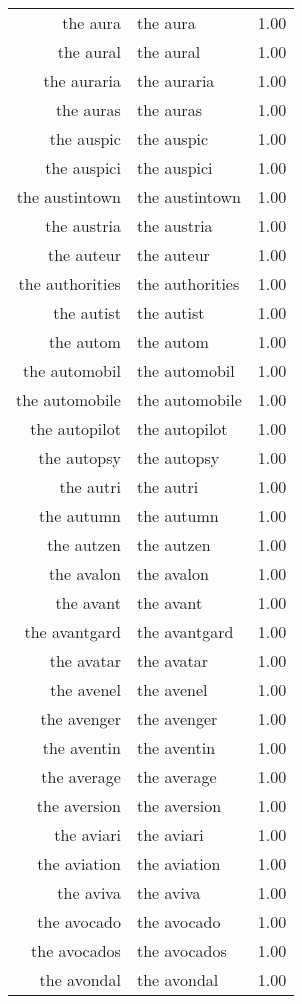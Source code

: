 \begin{table}[ht]
\begin{tabular}{rlr}
  the aura & the aura & 1.00 \\ 
  the aural & the aural & 1.00 \\ 
  the auraria & the auraria & 1.00 \\ 
  the auras & the auras & 1.00 \\ 
  the auspic & the auspic & 1.00 \\ 
  the auspici & the auspici & 1.00 \\ 
  the austintown & the austintown & 1.00 \\ 
  the austria & the austria & 1.00 \\ 
  the auteur & the auteur & 1.00 \\ 
  the authorities & the authorities & 1.00 \\ 
  the autist & the autist & 1.00 \\ 
  the autom & the autom & 1.00 \\ 
  the automobil & the automobil & 1.00 \\ 
  the automobile & the automobile & 1.00 \\ 
  the autopilot & the autopilot & 1.00 \\ 
  the autopsy & the autopsy & 1.00 \\ 
  the autri & the autri & 1.00 \\ 
  the autumn & the autumn & 1.00 \\ 
  the autzen & the autzen & 1.00 \\ 
  the avalon & the avalon & 1.00 \\ 
  the avant & the avant & 1.00 \\ 
  the avantgard & the avantgard & 1.00 \\ 
  the avatar & the avatar & 1.00 \\ 
  the avenel & the avenel & 1.00 \\ 
  the avenger & the avenger & 1.00 \\ 
  the aventin & the aventin & 1.00 \\ 
  the average & the average & 1.00 \\ 
  the aversion & the aversion & 1.00 \\ 
  the aviari & the aviari & 1.00 \\ 
  the aviation & the aviation & 1.00 \\ 
  the aviva & the aviva & 1.00 \\ 
  the avocado & the avocado & 1.00 \\ 
  the avocados & the avocados & 1.00 \\ 
  the avondal & the avondal & 1.00 \\ 

\end{tabular}
\end{table}
